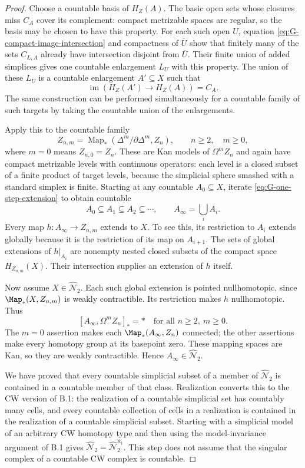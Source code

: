 \begin{proof}
Choose a countable basis of $H_Z(A)$. The basic open sets whose closures miss $C_A$ cover its complement: compact metrizable spaces are regular, so the basis may be chosen to have this property. For each such open $U$, equation \eqref{eq:G-compact-image-intersection} and compactness of $\overline U$ show that finitely many of the sets $C_{L,A}$ already have intersection disjoint from $\overline U$. Their finite union of added simplices gives one countable enlargement $L_U$ with this property. The union of these $L_U$ is a countable enlargement $A'\subseteq X$ such that
\begin{equation}\label{eq:G-one-step-extension}
 \operatorname{im}(H_Z(A')\to H_Z(A))=C_A.
\end{equation}
The same construction can be performed simultaneously for a countable family of such targets by taking the countable union of the enlargements.

Apply this to the countable family
\[
 Z_{n,m}=\operatorname{Map}_*(\Delta^m/\partial\Delta^m,Z_n),
       \qquad n\geq2,\quad m\geq0,
\]
where $m=0$ means $Z_{n,0}=Z_n$. These are Kan models of $\Omega^m Z_n$ and again have compact metrizable levels with continuous operators: each level is a closed subset of a finite product of target levels, because the simplicial sphere smashed with a standard simplex is finite. Starting at any countable $A_0\subseteq X$, iterate \eqref{eq:G-one-step-extension} to obtain countable
\[
 A_0\subseteq A_1\subseteq A_2\subseteq\cdots,
 \qquad A_\infty=\bigcup_i A_i.
\]
Every map $h:A_\infty\to Z_{n,m}$ extends to $X$. To see this, its restriction to $A_i$ extends globally because it is the restriction of its map on $A_{i+1}$. The sets of global extensions of $h|_{A_i}$ are nonempty nested closed subsets of the compact space $H_{Z_{n,m}}(X)$. Their intersection supplies an extension of $h$ itself.

Now assume $X\in\widehat{\mathcal N}_2$. Each such global extension is pointed nullhomotopic, since $\Map_*(X,Z_{n,m})$ is weakly contractible. Its restriction makes $h$ nullhomotopic. Thus
\[
 [A_\infty,\Omega^m Z_n]_* = *
       \quad\text{for all }n\geq2,\ m\geq0.
\]
The $m=0$ assertion makes each $\Map_*(A_\infty,Z_n)$ connected; the other assertions make every homotopy group at its basepoint zero. These mapping spaces are Kan, so they are weakly contractible. Hence $A_\infty\in\widehat{\mathcal N}_2$.

We have proved that every countable simplicial subset of a member of $\widehat{\mathcal N}_2$ is contained in a countable member of that class. Realization converts this to the CW version of B.1: the realization of a countable simplicial set has countably many cells, and every countable collection of cells in a realization is contained in the realization of a countable simplicial subset. Starting with a simplicial model of an arbitrary CW homotopy type and then using the model-invariance argument of B.1 gives
$\widehat{\mathcal N}_2=\widehat{\mathcal N}_2^{\aleph_1}$. This step does not assume that the singular complex of a countable CW complex is countable.


\end{proof}
